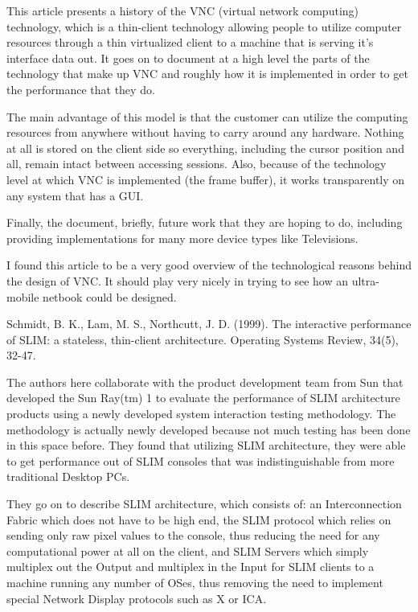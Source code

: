 \documentclass[12pt,oneside,letterpaper,titlepage]{article}
\begin{document}
This article presents a history of the VNC (virtual network computing)
technology, which is a thin-client technology allowing people to utilize
computer resources through a thin virtualized client to a machine that is
serving it's interface data out.  It goes on to document at a high level the
parts of the technology that make up VNC and roughly how it is implemented in
order to get the performance that they do.

The main advantage of this model is that the customer can utilize the computing
resources from anywhere without having to carry around any hardware.  Nothing at
all is stored on the client side so everything, including the cursor position
and all, remain intact between accessing sessions.  Also, because of the
technology level at which VNC is implemented (the frame buffer), it works
transparently on any system that has a GUI.

Finally, the document, briefly, future work that they are hoping to do,
including providing implementations for many more device types like Televisions.

I found this article to be a very good overview of the technological reasons
behind the design of VNC.  It should play very nicely in trying to see how an
ultra-mobile netbook could be designed.

Schmidt, B. K., Lam, M. S., Northcutt, J. D. (1999). The interactive performance of SLIM: a stateless, thin-client architecture. Operating Systems Review, 34(5), 32-47.

The authors here collaborate with the product development team from Sun that
developed the Sun Ray(tm) 1 to evaluate the performance of SLIM architecture
products using a newly developed system interaction testing methodology.  The
methodology is actually newly developed because not much testing has been done
in this space before.  They found that utilizing SLIM architecture, they were
able to get performance out of SLIM consoles that was indistinguishable from
more traditional Desktop PCs.

They go on to describe SLIM architecture, which consists of: an Interconnection
Fabric which does not have to be high end, the SLIM protocol which relies on
sending only raw pixel values to the console, thus reducing the need for any
computational power at all on the client, and SLIM Servers which simply
multiplex out the Output and multiplex in the Input for SLIM clients to a
machine running any number of OSes, thus removing the need to implement special
Network Display protocols such as X or ICA.
\end{document}

